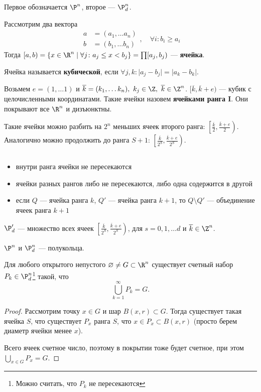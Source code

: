 \begin{ex}
	Первое обозначается $ \P^{n}$,  второе --- $ \P^{n}_{d}$.

	Рассмотрим два вектора
	\[
	\begin{aligned}
		a& = (a_1, \ldots a_{n}) \\
		b& = (b_1, \ldots b_n)
	\end{aligned}
	, \quad \forall i\colon b_i \ge a_i
	\]
	Тогда $ [a, b) = \{x \in \R^{n} \mid \forall j \colon a_j \le x < b_j\} = \prod [a_j, b_j)$ --- {\bf ячейка}.

	Ячейка называется {\bf кубической}, если $ \forall j, k \colon  \lvert a_j - b_j \rvert  = \lvert a_k - b_k \rvert $.

	Возьмем $ e = (1, \ldots 1)$ и $ \overline{k} = (k_1, \ldots k_n), ~ k_j \in \Z, ~ \overline{k} \in \Z^{n}$.
	$ [\overline{k}, \overline{k}+e)$ --- кубик с целочисленными координатами. Такие ячейки назовем {\bf ячейками ранга I}. Они покрывают все $ \R^{n} $ и дизъюнктны.  

	Такие ячейки можно разбить на $ 2^{n}$ меньших ячеек второго ранга: $ \left[ \frac{\overline{k}}{2}, \frac{\overline{k}+e}{2}\right)$. Аналогично можно продолжить до ранга $ S+1$:  $ \left[ \frac{\overline{k}}{2^{S}}, \frac{\overline{k}+e}{2^{S}} \right)$.
	\begin{prop}
		$ $
		\begin{itemize}
			\item внутри ранга ячейки не пересекаются
			\item ячейки разных рангов либо не пересекаются, либо одна содержится в другой
			\item если $ Q$ --- ячейка ранга $ k$, $ Q'$ --- ячейка ранга $ k+1$, то $ Q \setminus Q'$ --- объединение ячеек ранга $ k+1$
	    \end{itemize}
	\end{prop}
	$ \P_{d}' $ --- множество всех ячеек $ \left[ \frac{\overline{k}}{2^{S}}, \frac{\overline{k} +e}{2^{S}}\right)$, для $ s = 0, 1, \ldots d$ и $ \overline{k} \in \Z^{n}$.
\end{ex}
\begin{thm}
    $ \P^{n}$ и $ \P_{d}^{n}$ --- полукольца.
\end{thm}
\begin{thm}
	Для любого открытого непустого $ \varnothing \ne G \subset \R^{n} $ существует счетный набор $ P_k \in \P_{d}^{n}$\footnote{Можно считать, что $ P_k$ не пересекаются} такой, что
	\[
	\bigcup_{k=1}^{\infty} P_k = G
	.\] 
\end{thm}
\begin{proof}
	Рассмотрим точку $ x \in G$ и шар $ B(x, r) \subset G$.
	Тогда существует такая ячейка $ S$, что существует  $ P_x$ ранга $ S$, что  $ x \in P_x \subset B(x, r)$ (просто берем диаметр ячейки менее $ x$).

	Всего ячеек счетное число, поэтому в покрытии тоже будет счетное, при этом $ \bigcup_{x \in G} P_x = G$.
\end{proof}

